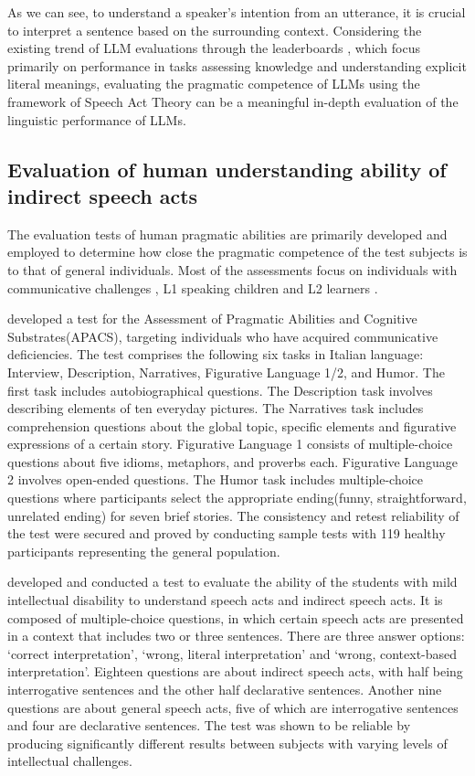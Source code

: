 As we can see, to understand a speaker’s intention from an utterance, it is crucial to interpret a sentence based on the surrounding context. Considering the existing trend of LLM evaluations through the leaderboards \citep{guo}, which focus primarily on performance in tasks assessing knowledge and understanding explicit literal meanings, evaluating the pragmatic competence of LLMs using the framework of Speech Act Theory can be a meaningful in-depth evaluation of the linguistic performance of LLMs.


\subsection*{Evaluation of human understanding ability of indirect speech acts}
The evaluation tests of human pragmatic abilities are primarily developed and employed to determine how close the pragmatic competence of the test subjects is to that of general individuals. Most of the assessments focus on individuals with communicative challenges \citep{arcara, kim17, seo, jang}, L1 speaking children and L2 learners \citep{oh}.

\cite{arcara} developed a test for the Assessment of Pragmatic Abilities and Cognitive Substrates(APACS), targeting individuals who have acquired communicative deficiencies. The test comprises the following six tasks in Italian language: Interview, Description, Narratives, Figurative Language 1/2, and Humor. The first task includes autobiographical questions. The Description task involves describing elements of ten everyday pictures. The Narratives task includes comprehension questions about the global topic, specific elements and figurative expressions of a certain story. Figurative Language 1 consists of multiple-choice questions about five idioms, metaphors, and proverbs each. Figurative Language 2 involves open-ended questions. The Humor task includes multiple-choice questions where participants select the appropriate ending(funny, straightforward, unrelated ending) for seven brief stories. The consistency and retest reliability of the test were secured and proved by conducting sample tests with 119 healthy participants representing the general population.

\cite{kim17} developed and conducted a test to evaluate the ability of the students with mild intellectual disability to understand speech acts and indirect speech acts. It is composed of multiple-choice questions, in which certain speech acts are presented in a context that includes two or three sentences. There are three answer options: ‘correct interpretation’, ‘wrong, literal interpretation’ and ‘wrong, context-based interpretation’. Eighteen questions are about indirect speech acts, with half being interrogative sentences and the other half declarative sentences. Another nine questions are about general speech acts, five of which are interrogative sentences and four are declarative sentences. The test was shown to be reliable by producing significantly different results between subjects with varying levels of intellectual challenges.

